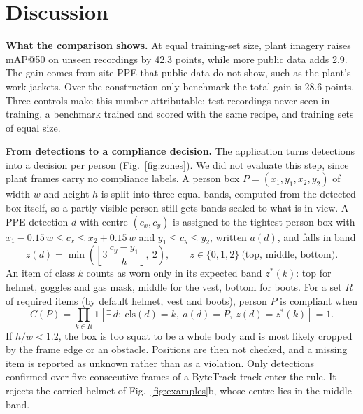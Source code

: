 \section{Discussion}\label{sec:discussion}

\textbf{What the comparison shows.} At equal training-set size, plant imagery raises mAP@50 on unseen recordings by 42.3 points, while more public data adds 2.9. The gain comes from site PPE that public data do not show, such as the plant's work jackets. Over the construction-only benchmark the total gain is 28.6 points. Three controls make this number attributable: test recordings never seen in training, a benchmark trained and scored with the same recipe, and training sets of equal size.

\textbf{From detections to a compliance decision.} The application turns detections into a decision per person (Fig.~\ref{fig:zones}). We did not evaluate this step, since plant frames carry no compliance labels. A person box $P=(x_1,y_1,x_2,y_2)$ of width $w$ and height $h$ is split into three equal bands, computed from the detected box itself, so a partly visible person still gets bands scaled to what is in view. A PPE detection $d$ with centre $(c_x,c_y)$ is assigned to the tightest person box with $x_1-0.15\,w \le c_x \le x_2+0.15\,w$ and $y_1 \le c_y \le y_2$, written $a(d)$, and falls in band
\begin{equation}
z(d) = \min\left(\left\lfloor 3\,\frac{c_y-y_1}{h} \right\rfloor,\ 2\right), \qquad z \in \{0,1,2\} \ \text{(top, middle, bottom)}.
\end{equation}
An item of class $k$ counts as worn only in its expected band $z^*(k)$: top for helmet, goggles and gas mask, middle for the vest, bottom for boots. For a set $R$ of required items (by default helmet, vest and boots), person $P$ is compliant when
\begin{equation}
C(P)=\prod_{k\in R}\mathbf{1}\left[\exists\, d:\ \mathrm{cls}(d)=k,\ a(d)=P,\ z(d)=z^*(k)\right]=1 .
\end{equation}
If $h/w<1.2$, the box is too squat to be a whole body and is most likely cropped by the frame edge or an obstacle. Positions are then not checked, and a missing item is reported as unknown rather than as a violation. Only detections confirmed over five consecutive frames of a ByteTrack track enter the rule. It rejects the carried helmet of Fig.~\ref{fig:examples}b, whose centre lies in the middle band.

